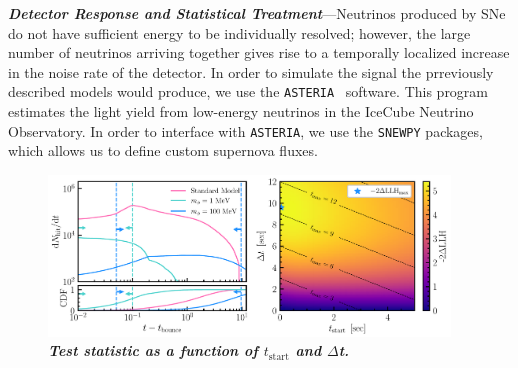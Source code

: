 \textbf{\textit{Detector Response and Statistical Treatment}}---Neutrinos produced by SNe do not have sufficient energy to be individually resolved; however, the large number of neutrinos arriving together gives rise to a temporally localized increase in the noise rate of the detector. 
In order to simulate the signal the prreviously described models would produce, we use the \texttt{ASTERIA}~\cite{spencer_griswold_2020_3926835} software.
This program estimates the light yield from low-energy neutrinos in the IceCube Neutrino Observatory.
In order to interface with \texttt{ASTERIA}, we use the \texttt{SNEWPY} packages, which allows us to define custom supernova fluxes.

\begin{figure}
    \centering
    \includegraphics[width=0.95\textwidth]{figures/hits_and_likelihood.pdf}
    \caption{\textbf{\textit{Test statistic as a function of $t_{\mathrm{start}}$ and $\Delta$t.}
    }}
    \label{fig:hits_and_likelihood}
\end{figure}